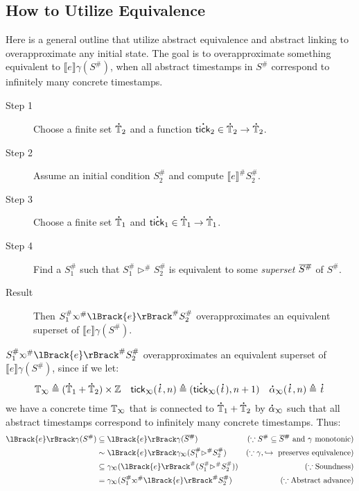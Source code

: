\documentclass[acmsmall,screen,review]{acmart}\settopmatter{printfolios=true,printccs=false,printacmref=false}
\theoremstyle{acmdefinition}
\def\ovbarw{1.2mu}
\def\ovbarh{1}
\newcommand*{\ovbar}[1]{\mkern \ovbarw\overline{\mkern-\ovbarw{\smash{#1}\scalebox{1}[\ovbarh]{\vphantom{i}}}\mkern-\ovbarw}\mkern \ovbarw}
\newcommand*{\A}[1]{\overset{\,_{\mbox{\Large .}}}{#1}}
\newcommand*{\Abs}[1]{{#1}^{\#}}
\newcommand*{\Time}{\mathbb{T}}
\newcommand*{\ATime}{\A{\Time}}
\newcommand*{\semarrow}{\hookrightarrow}
\newcommand*{\semlink}{\mathbin{\rotatebox[origin=c]{180}{$\propto$}}}
\newcommand*{\equivalent}{\sim}
\newcommand*{\sembracket}[1]{\lBrack{#1}\rBrack}
\newcommand*{\tick}{\mathsf{tick}}
\begin{document}
\subsection{How to Utilize Equivalence}
Here is a general outline that utilize abstract equivalence and abstract linking to overapproximate any initial state.
The goal is to overapproximate something equivalent to $\sembracket{e}\gamma(\Abs{S})$, when all abstract timestamps in $\Abs{S}$ correspond to infinitely many concrete timestamps.
\begin{description}
  \item[Step 1] Choose a finite set $\A\Time_2$ and a function $\A\tick_2\in\A\Time_2\rightarrow\A\Time_2$.
  \item[Step 2] Assume an initial condition $\Abs{S}_2$ and compute $\Abs{\sembracket{e}}\Abs{S}_2$.
  \item[Step 3] Choose a finite set $\A\Time_1$ and $\A\tick_1\in\A\Time_1\rightarrow\A\Time_1$.
  \item[Step 4] Find a $\Abs{S}_1$ such that $\Abs{S}_1\Abs\rhd\Abs{S}_2$ is equivalent to some \emph{superset} $\ovbar{\Abs{S}}$ of $\Abs{S}$.
  \item[Result] Then $\Abs{S}_1\Abs\semlink\Abs{\sembracket{e}}\Abs{S}_2$ overapproximates an equivalent superset of $\sembracket{e}\gamma(\Abs{S})$.
\end{description}
$\Abs{S}_1\Abs\semlink\Abs{\sembracket{e}}\Abs{S}_2$ overapproximates an equivalent superset of $\sembracket{e}\gamma(\Abs{S})$, since if we let:
\[\Time_{\semlink}\triangleq(\ATime_1+\ATime_2)\times\mathbb{Z}\quad\tick_{\semlink}(\A{t},n)\triangleq(\A\tick_{\semlink}(\A{t}),n+1)\quad\A\alpha_{\semlink}(\A{t},n)\triangleq\A{t}\]
we have a concrete time $\Time_{\semlink}$ that is connected to $\ATime_1+\ATime_2$ by $\A\alpha_{\semlink}$ such that all abstract timestamps correspond to infinitely many concrete timestamps.
Thus:
\begin{align*}
  \sembracket{e}\gamma(\Abs{S}) & \subseteq\sembracket{e}\gamma(\ovbar{\Abs{S}})                               & (\because\Abs{S}\subseteq\ovbar{\Abs{S}}\text{ and }\gamma\text{ monotonic}) \\
                                & \equivalent\sembracket{e}\gamma_{\semlink}(\Abs{S}_1\Abs\rhd\Abs{S}_2)       & (\because\gamma,\semarrow\text{ preserves equivalence})                      \\
                                & \subseteq\gamma_{\semlink}(\Abs{\sembracket{e}}(\Abs{S}_1\Abs\rhd\Abs{S}_2)) & (\because\text{Soundness})                                                   \\
                                & =\gamma_{\semlink}(\Abs{S}_1\Abs\semlink\Abs{\sembracket{e}}\Abs{S}_2)       & (\because\text{Abstract advance})
\end{align*}
\end{document}
